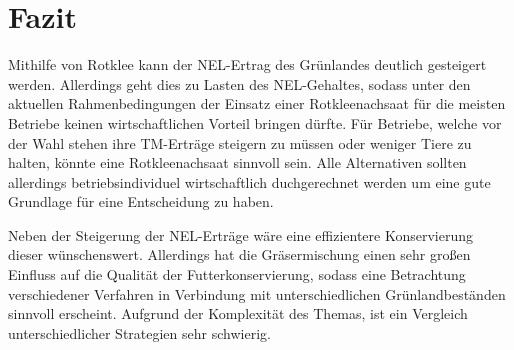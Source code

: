 \section{Fazit}
\label{sec:fazit}
Mithilfe von Rotklee kann der \ac{NEL}-Ertrag des Grünlandes deutlich gesteigert werden.
Allerdings geht dies zu Lasten des \ac{NEL}-Gehaltes, sodass unter den aktuellen Rahmenbedingungen der Einsatz einer Rotkleenachsaat für die meisten Betriebe keinen wirtschaftlichen Vorteil bringen dürfte.
Für Betriebe, welche vor der Wahl stehen ihre \ac{TM}-Erträge steigern zu müssen oder weniger Tiere zu halten, könnte eine Rotkleenachsaat sinnvoll sein.
Alle Alternativen sollten allerdings betriebsindividuel wirtschaftlich duchgerechnet werden um eine gute Grundlage für eine Entscheidung zu haben.

Neben der Steigerung der \ac{NEL}-Erträge wäre eine effizientere Konservierung dieser wünschenswert.
Allerdings hat die Gräsermischung einen sehr großen Einfluss auf die Qualität der Futterkonservierung, sodass eine Betrachtung verschiedener Verfahren in Verbindung mit unterschiedlichen Grünlandbeständen sinnvoll erscheint.
Aufgrund der Komplexität des Themas, ist ein Vergleich unterschiedlicher Strategien sehr schwierig.
